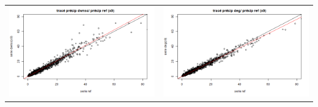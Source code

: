 \documentclass[a4paper,11pt]{article}
\begin{document}
\hspace{-1cm}
\begin{tabular}{cc} 
	\includegraphics[scale=0.4]{images/pr_1_ds.png} & \includegraphics[scale=0.4]{images/pr_1_dg.png}  \\ 

\end{tabular}
\end{document}
